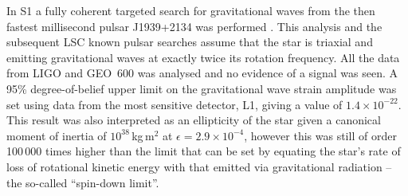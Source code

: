 \documentclass{article}
\begin{document}
In S1 a fully coherent targeted search for gravitational waves from the then
fastest millisecond pulsar J1939+2134 was performed \cite{Abbott:2004d}. This
analysis and the subsequent LSC known pulsar searches assume that the star is
triaxial and emitting gravitational waves at exactly twice its rotation
frequency. All the data from LIGO and GEO~600 was analysed and no evidence of a
signal was seen. A 95\% degree-of-belief upper limit on the gravitational wave
strain amplitude was set using data from the most sensitive detector, L1, giving
a value of $1.4\times10^{-22}$. This result was also interpreted as an
ellipticity of the star given a canonical moment of inertia of
$10^{38}$\,kg\,m$^2$ at $\epsilon = 2.9\times10^{-4}$, however this was still of
order 100\,000 times higher than the limit that can be set by equating the
star's rate of loss of rotational kinetic energy with that emitted via
gravitational radiation -- the so-called ``spin-down limit''.
\end{document}
